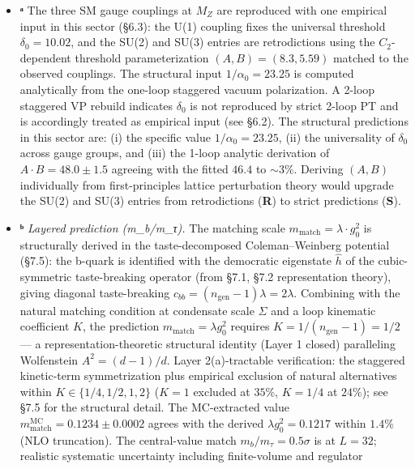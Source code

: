 \documentclass[
]{article}
\begin{document}
\begin{itemize}
\item
  \textbf{ᵃ} The three SM gauge couplings at \(M_Z\) are reproduced with
  one empirical input in this sector (§6.3): the U(1) coupling fixes the
  universal threshold \(\delta_0 = 10.02\), and the SU(2) and SU(3)
  entries are retrodictions using the \(C_2\)-dependent threshold
  parameterization \((A, B) = (8.3, 5.59)\) matched to the observed
  couplings. The structural input \(1/\alpha_0 = 23.25\) is computed
  analytically from the one-loop staggered vacuum polarization. A 2-loop
  staggered VP rebuild indicates \(\delta_0\) is not reproduced by
  strict 2-loop PT and is accordingly treated as empirical input (see
  §6.2). The structural predictions in this sector are: (i) the specific
  value \(1/\alpha_0 = 23.25\), (ii) the universality of \(\delta_0\)
  across gauge groups, and (iii) the 1-loop analytic derivation of
  \(A \cdot B = 48.0 \pm 1.5\) agreeing with the fitted \(46.4\) to
  \(\sim 3\%\). Deriving \((A, B)\) individually from first-principles
  lattice perturbation theory would upgrade the SU(2) and SU(3) entries
  from retrodictions (\textbf{R}) to strict predictions (\textbf{S}).
\item
  \textbf{ᵇ} \emph{Layered prediction (m\_b/m\_τ).} The matching scale
  \(m_{\text{match}} = \lambda \cdot g_0^2\) is structurally derived in
  the taste-decomposed Coleman--Weinberg potential (§7.5): the b-quark
  is identified with the democratic eigenstate \(\hat{h}\) of the
  cubic-symmetric taste-breaking operator (from §7.1, §7.2
  representation theory), giving diagonal taste-breaking
  \(c_{bb} = (n_{\text{gen}} - 1) \lambda = 2\lambda\). Combining with
  the natural matching condition at condensate scale \(\Sigma\) and a
  loop kinematic coefficient \(K\), the prediction
  \(m_{\text{match}} = \lambda g_0^2\) requires
  \(K = 1/(n_{\text{gen}} - 1) = 1/2\) --- a representation-theoretic
  structural identity (Layer 1 closed) paralleling Wolfenstein
  \(A^2 = (d-1)/d\). Layer 2(a)-tractable verification: the staggered
  kinetic-term symmetrization plus empirical exclusion of natural
  alternatives within \(K \in \{1/4, 1/2, 1, 2\}\) (\(K = 1\) excluded
  at \(35\%\), \(K = 1/4\) at \(24\%\)); see §7.5 for the structural
  detail. The MC-extracted value
  \(m_{\text{match}}^{\text{MC}} = 0.1234 \pm 0.0002\) agrees with the
  derived \(\lambda g_0^2 = 0.1217\) within \(1.4\%\) (NLO truncation).
  The central-value match \(m_b/m_\tau = 0.5\sigma\) is at \(L = 32\);
  realistic systematic uncertainty including finite-volume and regulator

\end{itemize}
\end{document}
